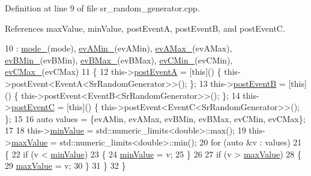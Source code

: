 Definition at line 9 of file sr\+\_\+random\+\_\+generator.\+cpp.



References max\+Value, min\+Value, post\+EventA, post\+EventB, and post\+EventC.


\begin{DoxyCode}
10     : \hyperlink{classsmacc_1_1state__reactors_1_1SrRandomGenerator_a10984da2fb51badf4fe6f25861120735}{mode\_}(mode), \hyperlink{classsmacc_1_1state__reactors_1_1SrRandomGenerator_aaa18a0eec1d0777ea1607b5ac7491495}{evAMin\_}(evAMin), \hyperlink{classsmacc_1_1state__reactors_1_1SrRandomGenerator_ad5148909923e6761c7de33749f324609}{evAMax\_}(evAMax), \hyperlink{classsmacc_1_1state__reactors_1_1SrRandomGenerator_ae1022906bed4d126b7520f81c3e52976}{evBMin\_}(evBMin), 
      \hyperlink{classsmacc_1_1state__reactors_1_1SrRandomGenerator_ad4b1ecc14ae3d153e3b1fe5006a8a192}{evBMax\_}(evBMax), \hyperlink{classsmacc_1_1state__reactors_1_1SrRandomGenerator_a048ec99a9978b1d51b8ecb96be4800c8}{evCMin\_}(evCMin), \hyperlink{classsmacc_1_1state__reactors_1_1SrRandomGenerator_af74df138d11468fd2b1d998698fd9503}{evCMax\_}(evCMax)
11 \{
12     this->\hyperlink{classsmacc_1_1state__reactors_1_1SrRandomGenerator_ac157de4b848ebc5da1acb593f7b25108}{postEventA} = [\textcolor{keyword}{this}]() \{ this->postEvent<EventA<SrRandomGenerator>>(); \};
13     this->\hyperlink{classsmacc_1_1state__reactors_1_1SrRandomGenerator_a0b38db23bf80e0709c2ae51c6a64ac1c}{postEventB} = [\textcolor{keyword}{this}]() \{ this->postEvent<EventB<SrRandomGenerator>>(); \};
14     this->\hyperlink{classsmacc_1_1state__reactors_1_1SrRandomGenerator_a1aeb07de7b52a9f5811e5f60444731a0}{postEventC} = [\textcolor{keyword}{this}]() \{ this->postEvent<EventC<SrRandomGenerator>>(); \};
15 
16     \textcolor{keyword}{auto} values = \{evAMin, evAMax, evBMin, evBMax, evCMin, evCMax\};
17 
18     this->\hyperlink{classsmacc_1_1state__reactors_1_1SrRandomGenerator_ab2a695fd1f34b17aff3ab36fb38e3765}{minValue} = std::numeric\_limits<double>::max();
19     this->\hyperlink{classsmacc_1_1state__reactors_1_1SrRandomGenerator_a693a1e627efe396dbb4f2849ce14d85d}{maxValue} = std::numeric\_limits<double>::min();
20     \textcolor{keywordflow}{for} (\textcolor{keyword}{auto} &v : values)
21     \{
22         \textcolor{keywordflow}{if} (v < \hyperlink{classsmacc_1_1state__reactors_1_1SrRandomGenerator_ab2a695fd1f34b17aff3ab36fb38e3765}{minValue})
23         \{
24             \hyperlink{classsmacc_1_1state__reactors_1_1SrRandomGenerator_ab2a695fd1f34b17aff3ab36fb38e3765}{minValue} = v;
25         \}
26 
27         \textcolor{keywordflow}{if} (v > \hyperlink{classsmacc_1_1state__reactors_1_1SrRandomGenerator_a693a1e627efe396dbb4f2849ce14d85d}{maxValue})
28         \{
29             \hyperlink{classsmacc_1_1state__reactors_1_1SrRandomGenerator_a693a1e627efe396dbb4f2849ce14d85d}{maxValue} = v;
30         \}
31     \}
32 \}
\end{DoxyCode}


